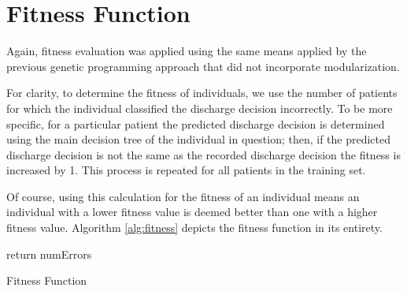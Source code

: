 \section{Fitness Function}\label{sec:fitness}
Again, fitness evaluation was applied using the same means applied by the previous genetic programming approach that did not incorporate modularization.

For clarity, to determine the fitness of individuals, we use the number of patients for which the individual classified the discharge decision incorrectly. To be more specific, for a particular patient the predicted discharge decision is determined using the main decision tree of the individual in question; then, if the predicted discharge decision is not the same as the recorded discharge decision the fitness is increased by 1. This process is repeated for all patients in the training set.

Of course, using this calculation for the fitness of an individual means an individual with a lower fitness value is deemed better than one with a higher fitness value. Algorithm \ref{alg:fitness} depicts the fitness function in its entirety.

\begin{algorithm}[H]\label{alg:fitness}
\SetAlgoLined
 \BlankLine
 return numErrors\;
 \caption{Fitness Function}
\end{algorithm}
